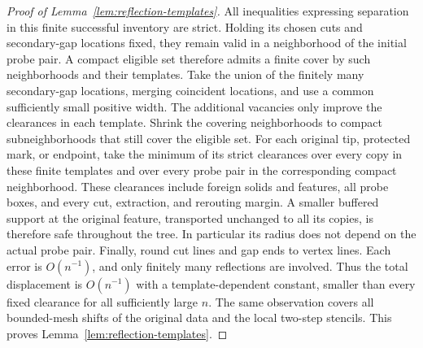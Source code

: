 \begin{proof}[Proof of Lemma~\ref{lem:reflection-templates}]
All inequalities expressing separation in this finite successful
inventory are strict. Holding its chosen cuts and secondary-gap
locations fixed, they remain valid in a neighborhood of the
initial probe pair. A compact eligible set therefore admits a
finite cover by such neighborhoods and their templates. Take the
union of the finitely many secondary-gap locations, merging
coincident locations, and use a common sufficiently small positive
width. The additional vacancies only improve the clearances in
each template.  Shrink the covering neighborhoods to compact
subneighborhoods that still cover the eligible set.  For each
original tip, protected mark, or endpoint, take the minimum of its
strict clearances over every copy in these finite templates and
over every probe pair in the corresponding compact neighborhood.
These clearances include foreign solids and features, all probe
boxes, and every cut, extraction, and rerouting margin.  A smaller
buffered support at the original feature, transported unchanged to
all its copies, is therefore safe throughout the tree.  In
particular its radius does not depend on the actual probe pair.
Finally, round cut lines and gap ends to vertex
lines. Each error is $O(n^{-1})$, and only finitely many reflections
are involved. Thus the total displacement is $O(n^{-1})$ with a
template-dependent constant, smaller than every fixed clearance
for all sufficiently large $n$. The same observation covers all
bounded-mesh shifts of the original data and the local two-step
stencils. This proves Lemma~\ref{lem:reflection-templates}.
\end{proof}

